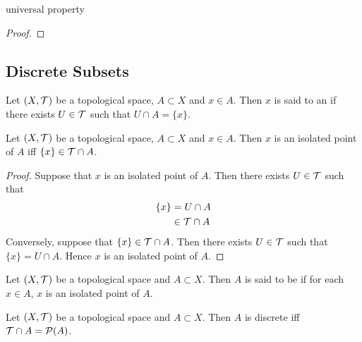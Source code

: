 \documentclass{book}
\begin{document}
\begin{ex} 
	universal property
\end{ex}

\begin{proof}
\end{proof}





















\subsection{Discrete Subsets}

\begin{defn} 
	Let $(X, \mathcal{T})$ be a topological space, $A \subset X$ and $x \in A$. Then $x$ is said to an  if there exists $U \in \mathcal{T}$ such that $U \cap A = \{x\}$. 
\end{defn}

\begin{ex} 
	Let $(X, \mathcal{T})$ be a topological space, $A \subset X$ and $x \in A$. Then $x$ is an isolated point of $A$ iff $\{x\} \in \mathcal{T} \cap A$.
\end{ex}

\begin{proof}
	Suppose that $x$ is an isolated point of $A$. Then there exists $U \in \mathcal{T}$ such that 
	\begin{align*}
		\{x\}
		& = U \cap A \\
		& \in \mathcal{T} \cap A
	\end{align*} 
	Conversely, suppose that $\{x\} \in \mathcal{T} \cap A$. Then there exists $U \in \mathcal{T}$ such that $\{x\} = U \cap A$. Hence $x$ is an isolated point of $A$.
\end{proof}

\begin{defn} 
	Let $(X, \mathcal{T})$ be a topological space and $A \subset X$. Then $A$ is said to be  if for each $x \in A$, $x$ is an isolated point of $A$.
\end{defn}

\begin{ex} 
	Let $(X, \mathcal{T})$ be a topological space and $A \subset X$. Then $A$ is discrete iff $\mathcal{T} \cap A = \mathcal{P}(A)$. 
\end{ex}
\end{document}
